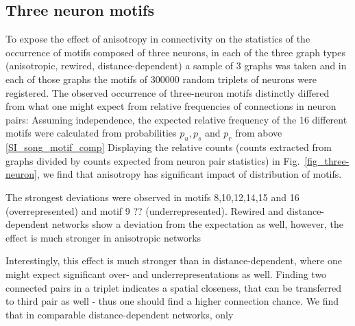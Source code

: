 

\subsection*{Three neuron motifs}



To expose the effect of anisotropy in connectivity on the statistics
of the occurrence of motifs composed of three neurons, in each of the
three graph types (anisotropic, rewired, distance-dependent) a sample
of 3 graphs was taken and in each of those graphs the motifs of 300000
random triplets of neurons were registered. %
The observed occurrence of three-neuron motifs distinctly differed
from what one might expect from relative frequencies of connections in
neuron pairs: Assuming independence, the expected relative frequency
of the 16 different motifs were calculated from probabilities $p_u,
p_s$ and $p_r$ from above %
\ref{SI_song_motif_comp}%
Displaying the relative counts (counts extracted from graphs divided
by counts expected from neuron pair statistics) in
Fig.~\ref{fig_three-neuron}, we find that anisotropy has significant
impact of distribution of motifs. 

The strongest deviations were
observed in motifs 8,10,12,14,15 and 16 (overrepresented) and motif 9 ??
(underrepresented). Rewired and distance-dependent networks show a
deviation from the expectation as well, however, the effect is much
stronger in anisotropic networks

Interestingly, this effect is much stronger than in
distance-dependent, where one might expect significant over- and
underrepresentations as well. Finding two connected pairs in a triplet
indicates a spatial closeness, that can be transferred to third pair
as well - thus one should find a higher connection chance. We find
that in comparable distance-dependent networks, only


